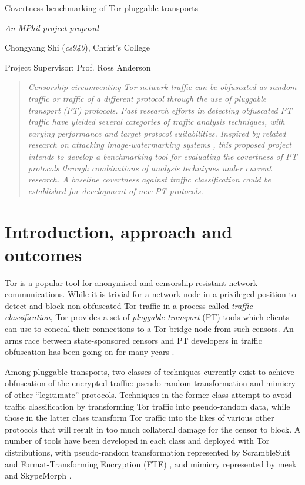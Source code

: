 \documentclass[11pt]{article}
\begin{document}
\centerline{\Large Covertness benchmarking of Tor pluggable transports}
\vspace{2em}
\centerline{\Large \emph{An MPhil project proposal}}
\vspace{2em}
\centerline{\large Chongyang Shi (\emph{cs940}), Christ's College}
\vspace{1em}
\centerline{\large Project Supervisor: Prof. Ross Anderson}
\vspace{1em}

\begin{abstract}
\textsl{Censorship-circumventing Tor network traffic can be obfuscated as random traffic or traffic of a different protocol through the use of pluggable transport (PT) protocols. Past research efforts in detecting obfuscated PT traffic have yielded several categories of traffic analysis techniques, with varying performance and target protocol suitabilities. Inspired by related research on attacking image-watermarking systems \cite{petitcolas1998attacks}, this proposed project intends to develop a benchmarking tool for evaluating the covertness of PT protocols through combinations of analysis techniques under current research. A baseline covertness against traffic classification could be established for development of new PT protocols.} 
\end{abstract}

\section{Introduction, approach and outcomes}

Tor is a popular tool for anonymised and censorship-resistant network communications. While it is trivial for a network node in a privileged position to detect and block non-obfuscated Tor traffic \cite[Tb. 6] {bujlow2015independent} in a process called \emph{traffic classification}, Tor provides a set of \emph{pluggable transport} (PT) tools which clients can use to conceal their connections to a Tor bridge node from such censors. An arms race between state-sponsored censors and PT developers in traffic obfuscation has been going on for many years \cite{khattak2014systemization}. 

Among pluggable transports, two classes of techniques currently exist to achieve obfuscation of the encrypted traffic: pseudo-random transformation and mimicry of other ``legitimate'' protocols. Techniques in the former class attempt to avoid traffic classification by transforming Tor traffic into pseudo-random data, while those in the latter class transform Tor traffic into the likes of various other protocols that will result in too much collateral damage for the censor to block. A number of tools have been developed in each class and deployed with Tor distributions, with pseudo-random transformation represented by ScrambleSuit \cite{winter2013scramblesuit} and Format-Transforming Encryption (FTE) \cite{dyer2013protocol}, and mimicry represented by meek \cite{fifield2015blocking} and SkypeMorph \cite{mohajeri2012skypemorph}. 
\end{document}
